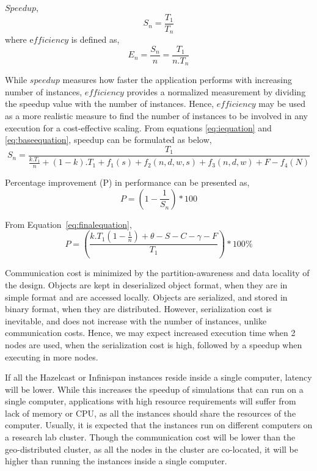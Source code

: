 $Speedup$, 
\begin{equation} \label{eq:baseequation}
S_{n} = \frac{T_{1}}{T_{n}}
\end{equation}
where e$fficiency$ is defined as,
\begin{equation} \label{eq:basefequation}
E_{n} = \frac{S_{n}}{n} = \frac{T_{1}}{n.T_{n}}
\end{equation}

While $speedup$ measures how faster the application performs with increasing number of instances, $efficiency$ provides a normalized measurement by dividing the speedup value with the number of instances. Hence, $efficiency$ may be used as a more realistic measure to find the number of instances to be involved in any execution for a cost-effective scaling.
From equations \ref{eq:iequation} and \ref{eq:baseequation}, speedup can be formulated as below,
\begin{equation} \label{eq:finalequation}
S_{n} = \frac{T_{1}}{\frac{k.T_{1}}{n} + (1-k).T_{1} + f_{1}(s) + f_{2}(n, d, w, s) + f_{3}(n, d, w) + F - f_{4}(N)}
\end{equation}

Percentage improvement (P) in performance can be presented as,
\begin{equation} \label{eq:percentage}
P = (1 - \frac{1}{S_{n}}) * 100\end{equation}

From Equation~\ref{eq:finalequation},
\begin{equation} \label{eq:percentageFinal}
P = (\frac{k.T_{1}(1-\frac{1}{n}) + \theta - S - C - \gamma - F}{T_{1}}) * 100\%
\end{equation}


Communication cost is minimized by the partition-awareness and data locality of the design. Objects are kept in deserialized object format, when they are in simple format and are accessed locally. Objects are serialized, and stored in binary format, when they are distributed. However, serialization cost is inevitable, and does not increase with the number of instances, unlike communication costs. Hence, we may expect increased execution time when 2 nodes are used, when the serialization cost is high, followed by a speedup when executing in more nodes.

If all the Hazelcast or Infinispan instances reside inside a single computer, latency will be lower. While this increases the speedup of simulations that can run on a single computer, applications with high resource requirements will suffer from lack of memory or CPU, as all the instances should share the resources of the computer. Usually, it is expected that the instances run on different computers on a research lab cluster. Though the communication cost will be lower than the geo-distributed cluster, as all the nodes in the cluster are co-located, it will be higher than running the instances inside a single computer. 

